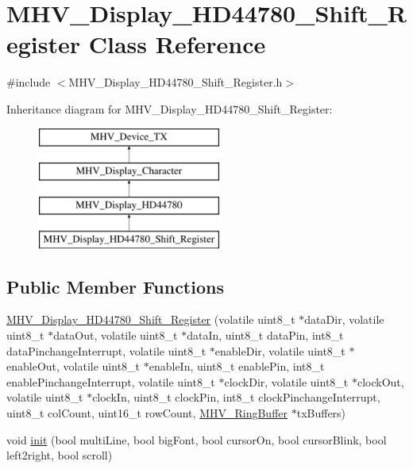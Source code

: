 \hypertarget{class_m_h_v___display___h_d44780___shift___register}{
\section{\-M\-H\-V\-\_\-\-Display\-\_\-\-H\-D44780\-\_\-\-Shift\-\_\-\-Register \-Class \-Reference}
\label{class_m_h_v___display___h_d44780___shift___register}
}


{\ttfamily \#include $<$\-M\-H\-V\-\_\-\-Display\-\_\-\-H\-D44780\-\_\-\-Shift\-\_\-\-Register.\-h$>$}

\-Inheritance diagram for \-M\-H\-V\-\_\-\-Display\-\_\-\-H\-D44780\-\_\-\-Shift\-\_\-\-Register\-:\begin{figure}[H]
\begin{center}
\leavevmode
\includegraphics[height=4.000000cm]{class_m_h_v___display___h_d44780___shift___register}
\end{center}
\end{figure}
\subsection*{\-Public \-Member \-Functions}
\begin{DoxyCompactItemize}
\item 
\hyperlink{class_m_h_v___display___h_d44780___shift___register_a8c4ef3a31338b4e53153feeb94af16ec}{\-M\-H\-V\-\_\-\-Display\-\_\-\-H\-D44780\-\_\-\-Shift\-\_\-\-Register} (volatile uint8\-\_\-t $\ast$data\-Dir, volatile uint8\-\_\-t $\ast$data\-Out, volatile uint8\-\_\-t $\ast$data\-In, uint8\-\_\-t data\-Pin, int8\-\_\-t data\-Pinchange\-Interrupt, volatile uint8\-\_\-t $\ast$enable\-Dir, volatile uint8\-\_\-t $\ast$enable\-Out, volatile uint8\-\_\-t $\ast$enable\-In, uint8\-\_\-t enable\-Pin, int8\-\_\-t enable\-Pinchange\-Interrupt, volatile uint8\-\_\-t $\ast$clock\-Dir, volatile uint8\-\_\-t $\ast$clock\-Out, volatile uint8\-\_\-t $\ast$clock\-In, uint8\-\_\-t clock\-Pin, int8\-\_\-t clock\-Pinchange\-Interrupt, uint8\-\_\-t col\-Count, uint16\-\_\-t row\-Count, \hyperlink{class_m_h_v___ring_buffer}{\-M\-H\-V\-\_\-\-Ring\-Buffer} $\ast$tx\-Buffers)
\item 
void \hyperlink{class_m_h_v___display___h_d44780___shift___register_acb15d889b37de1be9f0f0b45dd5308d7}{init} (bool multi\-Line, bool big\-Font, bool cursor\-On, bool cursor\-Blink, bool left2right, bool scroll)
\end{DoxyCompactItemize}
